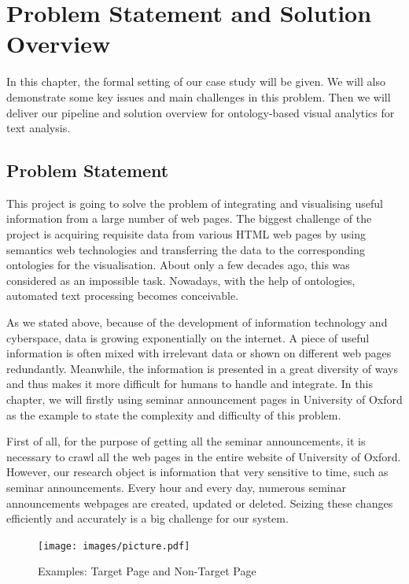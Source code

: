 \chapter{Problem Statement and Solution Overview}\label{chapter:solution}
In this chapter, the formal setting of our case study will be given. We will also demonstrate some key issues and main challenges in this problem. Then we will deliver our pipeline and solution overview for ontology-based visual analytics for text analysis.

\section{Problem Statement}
This project is going to solve the problem of integrating and visualising useful information from a large number of web pages. The biggest challenge of the project is acquiring requisite data from various HTML web pages by using semantics web technologies and transferring the data to the corresponding ontologies for the visualisation. About only a few decades ago, this was considered as an impossible task. Nowadays, with the help of ontologies, automated text processing becomes conceivable\cite{krallinger2012link}.

As we stated above, because of the development of information technology and cyberspace, data is growing exponentially on the internet. A piece of useful information is often mixed with irrelevant data or shown on different web pages redundantly. Meanwhile, the information is presented in a great diversity of ways and thus makes it more difficult for humans to handle and integrate\cite{anantharangachar2013InfoExtraction}. In this chapter, we will firstly using seminar announcement pages in University of Oxford as the example to state the complexity and difficulty of this problem.

First of all, for the purpose of getting all the seminar announcements, it is necessary to crawl all the web pages in the entire website of University of Oxford. However, our research object is information that very sensitive to time, such as seminar announcements. Every hour and every day, numerous seminar announcements webpages are created, updated or deleted. Seizing these changes efficiently and accurately is a big challenge for our system. 

\begin{figure}[htb!]
	\centering
	\texttt{[image: images/picture.pdf]}
	\caption{Examples: Target Page and Non-Target Page}\label{fig:emp:target_vs_non}
\end{figure}

